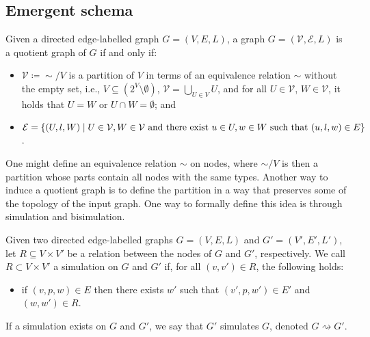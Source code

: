 \subsection*{Emergent schema}\label{app:emergent-schema}
\begin{definition}\label{def:quotient-graph}
    Given a directed edge-labelled graph $G = (V, E, L)$, a graph $G = (\mathcal{V}, \mathcal{E}, L)$ is a quotient graph of $G$ if and only if:
        \begin{itemize}
                \item $\mathcal{V}\coloneqq \sim/V$ is a partition of $V$ in terms of an equivalence relation $\sim$ without the empty set, i.e., $V \subseteq (2^V \setminus \emptyset)$, $\mathcal{V} = \bigcup_{U \in V} U$, and for all $U \in \mathcal{V}$, $W \in \mathcal{V}$, it holds that $U = W$ or $U \cap W = \emptyset$; and
                \item $\mathcal{E} = \{(U, l, W) \mid U \in \mathcal{V}, W \in \mathcal{V} \text{ and there exist } u \in U, w \in W \text{ such that }\\ (u, l, w) \in E\}$.
        \end{itemize}
\end{definition}

One might define an equivalence relation $\sim$ on nodes, where $\sim/ V$ is then a partition whose parts contain all nodes with the same types. Another way to induce a quotient graph is to define the partition in a way that preserves some of the topology of the input graph. One way to formally define this idea is through simulation and bisimulation.

\begin{definition}[Simulation]
    Given two directed edge-labelled graphs $G = (V, E, L)$ and $G' = (V', E', L')$, let $R \subseteq V \times V'$ be a relation between the nodes of $G$ and $G'$, respectively. We call $R\subset V\times V'$ a simulation on $G$ and $G'$ if, for all $(v, v') \in R$, the following holds:
    \begin{itemize}
        \item if $(v, p, w) \in E$ then there exists $w'$ such that $(v', p, w') \in E'$ and $(w, w') \in R$.
    \end{itemize}
If a simulation exists on $G$ and $G'$, we say that $G'$ simulates $G$, denoted $G \rightsquigarrow G'$.
\end{definition}

